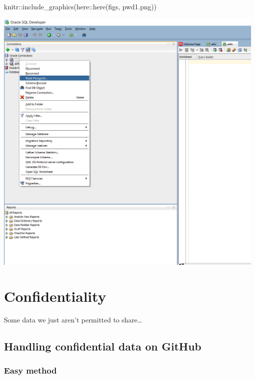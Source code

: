 \documentclass[
]{book}
\newenvironment{Shaded}{\begin{snugshade}}{\end{snugshade}}
\newcommand{\FunctionTok}[1]{\textcolor[rgb]{0.00,0.00,0.00}{#1}}
\newcommand{\NormalTok}[1]{#1}
\newcommand{\SpecialCharTok}[1]{\textcolor[rgb]{0.00,0.00,0.00}{#1}}
\newcommand{\StringTok}[1]{\textcolor[rgb]{0.31,0.60,0.02}{#1}}
\begin{document}
\begin{Shaded}
\begin{Highlighting}[]
\NormalTok{knitr}\SpecialCharTok{::}\FunctionTok{include\_graphics}\NormalTok{(here}\SpecialCharTok{::}\FunctionTok{here}\NormalTok{(}\StringTok{\textquotesingle{}figs\textquotesingle{}}\NormalTok{, }\StringTok{\textquotesingle{}pwd1.png\textquotesingle{}}\NormalTok{))}
\end{Highlighting}
\end{Shaded}

\includegraphics{figs/pwd1.png}

\hypertarget{confidentiality}{%
\section{Confidentiality}\label{confidentiality}}

Some data we just aren't permitted to share\ldots{}

\hypertarget{handling-confidential-data-on-github}{%
\subsection{Handling confidential data on GitHub}\label{handling-confidential-data-on-github}}

\hypertarget{easy-method}{%
\subsubsection{Easy method}\label{easy-method}}
\end{document}
